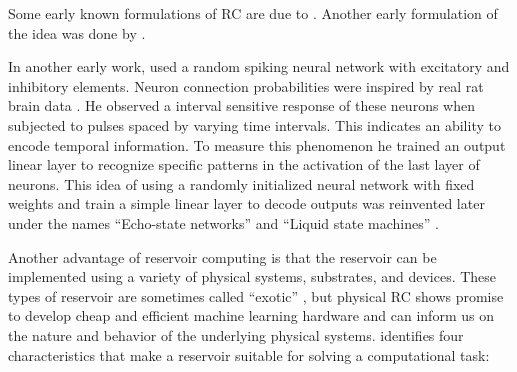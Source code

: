 Some early known formulations of \ac{RC} are due to
\textcite{kirbyContextDynamicsNeural1991}. Another early formulation of the idea
was done by \textcite{schomakerNeuralNetworkModels1990,
  schomakerSimulationRecognitionHandwriting1991,
  schomakerNeuralOscillatornetworkModel1992}.

In another early work, \textcite{buonomanoTemporalInformationTransformed1995}
used a random spiking neural network with excitatory and inhibitory elements.
Neuron connection probabilities were inspired by real rat brain data
\parencite{masonSynapticTransmissionIndividual1991}. He observed a interval
sensitive response of these neurons when subjected to pulses spaced by varying
time intervals. This indicates an ability to encode temporal information. To
measure this phenomenon he trained an output linear layer to recognize specific
patterns in the activation of the last layer of neurons. This idea of using a
randomly initialized neural network with fixed weights and train a simple linear
layer to decode outputs was reinvented later under the names ``Echo-state
networks'' \parencite{jaegerEchoStateApproach2001} and ``Liquid state machines''
\parencite{maassRealTimeComputingStable2002}.

Another advantage of reservoir computing is that the reservoir can be
implemented using a variety of physical systems, substrates, and devices. These
types of reservoir are sometimes called ``exotic''
\parencite{lukoseviciusReservoirComputingApproaches2009}, but physical \ac{RC}
shows promise to develop cheap and efficient machine learning hardware and can
inform us on the nature and behavior of the underlying physical systems.
\textcite{tanakaRecentAdvancesPhysical2019} identifies four characteristics that
make a reservoir suitable for solving a computational task:


